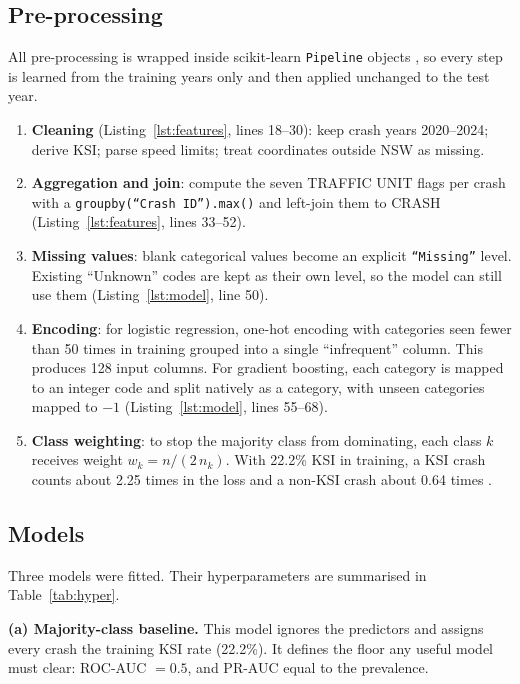 \documentclass[11pt,a4paper]{article}
\begin{document}
\subsection{Pre-processing}
\label{sec:preprocessing}
All pre-processing is wrapped inside scikit-learn \texttt{Pipeline} objects \parencite{pedregosa2011}, so every
step is learned from the training years only and then applied unchanged to the test year.
\begin{enumerate}
  \item \textbf{Cleaning} (Listing~\ref{lst:features}, lines 18--30): keep crash years 2020--2024; derive KSI;
        parse speed limits; treat coordinates outside NSW as missing.
  \item \textbf{Aggregation and join}: compute the seven TRAFFIC UNIT flags per crash with a
        \texttt{groupby(\enquote{Crash ID}).max()} and left-join them to CRASH (Listing~\ref{lst:features}, lines 33--52).
  \item \textbf{Missing values}: blank categorical values become an explicit \texttt{\enquote{Missing}} level. Existing
        \enquote{Unknown} codes are kept as their own level, so the model can still use them (Listing~\ref{lst:model}, line 50).
  \item \textbf{Encoding}: for logistic regression, one-hot encoding with categories seen fewer than 50 times in
        training grouped into a single \enquote{infrequent} column. This produces 128 input columns. For gradient
        boosting, each category is mapped to an integer code and split natively as a category, with unseen
        categories mapped to $-1$ (Listing~\ref{lst:model}, lines 55--68).
  \item \textbf{Class weighting}: to stop the majority class from dominating, each class $k$ receives weight
        $w_k = n / (2\,n_k)$. With 22.2\% KSI in training, a KSI crash counts about 2.25 times in the loss and a
        non-KSI crash about 0.64 times \parencite{he2009}.
\end{enumerate}

\subsection{Models}
\label{sec:models}
Three models were fitted. Their hyperparameters are summarised in Table~\ref{tab:hyper}.

\textbf{(a) Majority-class baseline.} This model ignores the predictors and assigns every crash the training KSI
rate (22.2\%). It defines the floor any useful model must clear: ROC-AUC $=0.5$, and PR-AUC equal to the
prevalence.
\end{document}
